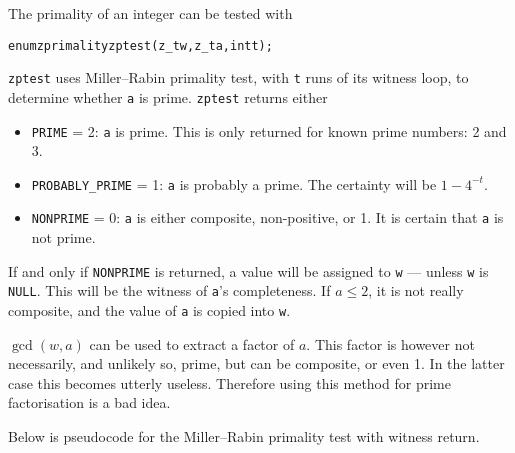The primality of an integer can be tested with

\begin{alltt}
   enum zprimality zptest(z_t w, z_t a, int t);
\end{alltt}

\noindent
{\tt zptest} uses Miller–Rabin primality test,
with {\tt t} runs of its witness loop, to
determine whether {\tt a} is prime. {\tt zptest}
returns either

\begin{itemize}
\item {\tt PRIME} = 2:
{\tt a} is prime. This is only returned for
known prime numbers: 2 and 3.

\item {\tt PROBABLY\_PRIME} = 1:
{\tt a} is probably a prime. The certainty
will be $1 - 4^{-t}$.

\item {\tt NONPRIME} = 0:
{\tt a} is either composite, non-positive, or 1.
It is certain that {\tt a} is not prime.
\end{itemize}

If and only if {\tt NONPRIME} is returned, a
value will be assigned to {\tt w} — unless
{\tt w} is {\tt NULL}. This will be the witness
of {\tt a}'s completeness. If $a \le 2$, it
is not really composite, and the value of
{\tt a} is copied into {\tt w}.

$\gcd(w, a)$ can be used to extract a factor
of $a$. This factor is however not necessarily,
and unlikely so, prime, but can be composite,
or even 1. In the latter case this becomes
utterly useless. Therefore using this method
for prime factorisation is a bad idea.

Below is pseudocode for the Miller–Rabin primality
test with witness return.

